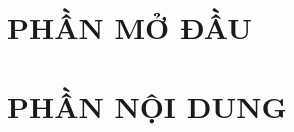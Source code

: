 \documentclass[10pt,a5paper,oneside]{memoir}
\begin{document}
	
  
\chapter{PHẦN MỞ ĐẦU}	

\chapter{PHẦN NỘI DUNG}

%
\end{document}

